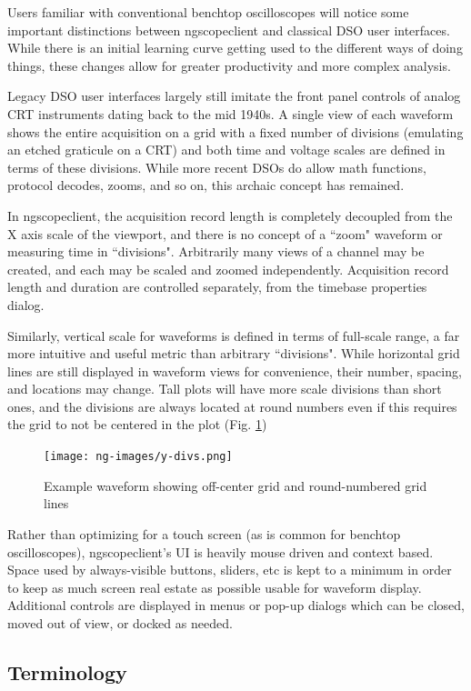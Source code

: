 Users familiar with conventional benchtop oscilloscopes will notice some important distinctions between ngscopeclient
and classical DSO user interfaces. While there is an initial learning curve getting used to the different ways of doing
things, these changes allow for greater productivity and more complex analysis.

Legacy DSO user interfaces largely still imitate the front panel controls of analog CRT instruments dating back to the
mid 1940s. A single view of each waveform shows the entire acquisition on a grid with a fixed number of divisions
(emulating an etched graticule on a CRT) and both time and voltage scales are defined in terms of these divisions.
While more recent DSOs do allow math functions, protocol decodes, zooms, and so on, this archaic concept has remained.

In ngscopeclient, the acquisition record length is completely decoupled from the X axis scale of the viewport, and
there is no concept of a ``zoom" waveform or measuring time in ``divisions". Arbitrarily many views of a channel may be
created, and each may be scaled and zoomed independently. Acquisition record length and duration are controlled
separately, from the timebase properties dialog.

Similarly, vertical scale for waveforms is defined in terms of full-scale range, a far more intuitive and useful metric
than arbitrary ``divisions". While horizontal grid lines are still displayed in waveform views for convenience, their
number, spacing, and locations may change. Tall plots will have more scale divisions than short ones, and the divisions
are always located at round numbers even if this requires the grid to not be centered in the plot (Fig. \ref{y-divs})

\begin{figure}[h]
\centering
\texttt{[image: ng-images/y-divs.png]}
\caption{Example waveform showing off-center grid and round-numbered grid lines}
\label{y-divs}
\end{figure}

Rather than optimizing for a touch screen (as is common for benchtop oscilloscopes), ngscopeclient's UI is
heavily mouse driven and context based. Space used by always-visible buttons, sliders, etc is kept to a minimum in
order to keep as much screen real estate as possible usable for waveform display. Additional controls are displayed in
menus or pop-up dialogs which can be closed, moved out of view, or docked as needed.

\subsection{Terminology}


